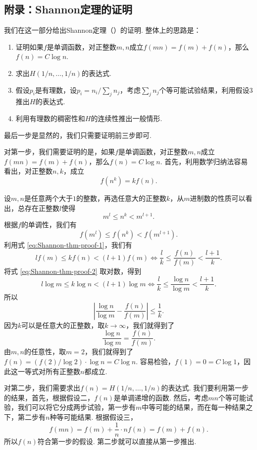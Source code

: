 \begin{appsec}
\section{附录：Shannon定理的证明}\label{sec:Shannon-thm-proofs}
我们在这一部分给出Shannon定理（）的证明. 整体上的思路是：
\begin{enumerate}
    \item 证明如果$f$是单调函数，对正整数$m,n$成立$f(mn)=f(m)+f(n)$，那么$f(n)=C\log n$.
    \item 求出$H(1/n,\dots,1/n)$的表达式.
    \item 假设$p_i$是有理数，设$p_i=n_i/\sum_j n_j$，考虑$\sum_j n_j$个等可能试验结果，利用假设3推出$H$的表达式.
    \item 利用有理数的稠密性和$H$的连续性推出一般情形.
\end{enumerate}
最后一步是显然的，我们只需要证明前三步即可.

对第一步，我们需要证明的是，如果$f$是单调函数，对正整数$m,n$成立$f(mn)=f(m)+f(n)$，那么$f(n)=C\log n$. 首先，利用数学归纳法容易看出，对正整数$n,k$，成立
\begin{equation}
    f(n^k)=kf(n).\label{eq:Shannon-thm-proof-1}
\end{equation}

设$m,n$是任意两个大于$1$的整数，再选任意大的正整数$k$，从$m$进制数的性质可以看出，总存在正整数$l$使得
\begin{equation}
    m^l\leq n^k < m^{l+1}.\label{eq:Shannon-thm-proof-2}
\end{equation}
根据$f$的单调性，我们有
\[
    f(m^l)\leq f(n^k) < f(m^{l+1}).
\]
利用式 \eqref{eq:Shannon-thm-proof-1}，我们有
\[
    lf(m)\leq kf(n) < (l+1)f(m)\iff \frac{l}{k}\leq \frac{f(n)}{f(m)} < \frac{l+1}{k}.
\]
将式 \eqref{eq:Shannon-thm-proof-2} 取对数，得到
\[
    l\log m\leq k\log n < (l+1)\log m\iff \frac{l}{k}\leq \frac{\log n}{\log m} < \frac{l+1}{k}.
\]
所以
\[
    \left|\frac{\log n}{\log m}-\frac{f(n)}{f(m)}\right|\leq\frac1k.
\]
因为$k$可以是任意大的正整数，取$k\to\infty$，我们就得到了
\[
    \frac{\log n}{\log m}=\frac{f(n)}{f(m)}.
\]
由$m,n$的任意性，取$m=2$，我们就得到了$f(n)=(f(2)/\log 2)\cdot \log n= C\log n$. 容易检验，$f(1)=0=C\log 1$，因此这一等式对所有正整数$n$都成立.

对第二步，我们需要求出$f(n)=H(1/n,\dots,1/n)$的表达式. 我们要利用第一步的结果，首先，根据假设二，$f(n)$是单调递增的函数. 然后，考虑$mn$个等可能试验，我们可以将它分成两步试验，第一步有$m$中等可能的结果，而在每一种结果之下，第二步有$n$种等可能结果. 根据假设三，
\[
f(mn)=f(m)+\frac{1}{n}\cdot nf(n)=f(m)+f(n).    
\]
所以$f(n)$符合第一步的假设. 第二步就可以直接从第一步推出.


\end{appsec}
